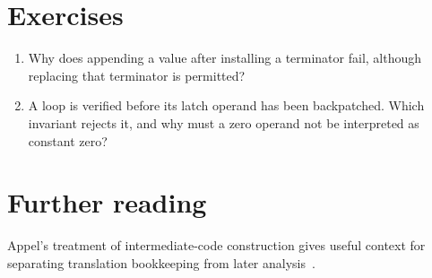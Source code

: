 \section{Exercises}
\label{sec:pebble-six-exercises}
\begin{enumerate}
\item \label{ex:pebble-builder-order} Why does appending a value after installing a terminator fail, although replacing that terminator is permitted?
\item \label{ex:pebble-pending-phi} A loop is verified before its latch operand has been backpatched. Which invariant rejects it, and why must a zero operand not be interpreted as constant zero?
\end{enumerate}

\section{Further reading}
\label{sec:pebble-six-reading}
Appel's treatment of intermediate-code construction gives useful context for separating translation bookkeeping from later analysis~\cite{appel-1998-modern}.
